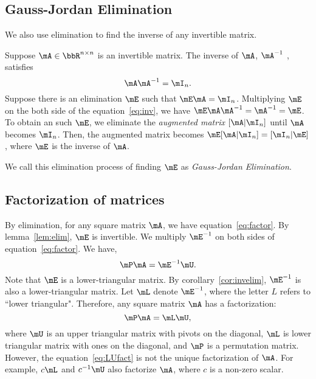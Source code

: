 \documentclass[11pt]{article}
\theoremstyle{plain}
\theoremstyle{definition}
\begin{document}
\subsection{Gauss-Jordan Elimination}
We also use elimination to find the inverse of any invertible matrix.

\vspace{0.2cm}
 Suppose $\mA \in \bbR^{n \times n}$ is an invertible matrix. The inverse of $\mA$, $\mA^{-1}$ , satisfies 
 \begin{equation}\label{eq:inv}
 	\mA \mA^{-1} = \mI_n.
 \end{equation}
 Suppose there is an elimination $\mE$ such that $\mE \mA = \mI_n$. Multiplying $\mE$ on the both side of the equation~\eqref{eq:inv}, we have $\mE  \mA \mA^{-1}= \mA^{-1} = \mE$. To obtain an such $\mE$, we eliminate the \textit{augmented matrix} $[\mA|\mI_n]$ until $\mA$ becomes $\mI_n$. Then, the augmented matrix becomes $\mE[\mA|\mI_n] = [\mI_n|\mE]$, where $\mE$ is the inverse of $\mA$.
 
 \vspace{0.2cm}
We call this elimination process of finding $\mE$ as \textit{Gauss-Jordan Elimination}.



\subsection{Factorization of matrices}
By elimination, for any square matrix $\mA$, we have equation~\eqref{eq:factor}.
 By lemma~\ref{lem:elim}, $\mE$ is invertible. We multiply $\mE^{-1}$ on both sides of equation~\eqref{eq:factor}. We have, 
\[ \mP \mA = \mE^{-1} \mU. \]
 Note that $\mE$ is a lower-triangular matrix. By corollary~\ref{cor:invelim}, $\mE^{-1}$ is also a lower-triangular matrix. Let $\mL$ denote $\mE^{-1}$, where the letter $L$ refers to ``lower triangular". Therefore, any square matrix $\mA$ has a factorization:
\begin{equation}\label{eq:LUfact}
	\mP \mA = \mL \mU,
\end{equation}
where $\mU$ is an upper triangular matrix with pivots on the diagonal, $\mL$ is lower triangular matrix with ones on the diagonal, and $\mP$ is a permutation matrix. However, the equation~\eqref{eq:LUfact} is not the unique factorization of $\mA$. For example, $c\mL$ and $c^{-1}\mU$ also factorize $\mA$, where $c$ is a non-zero scalar.
\end{document}
